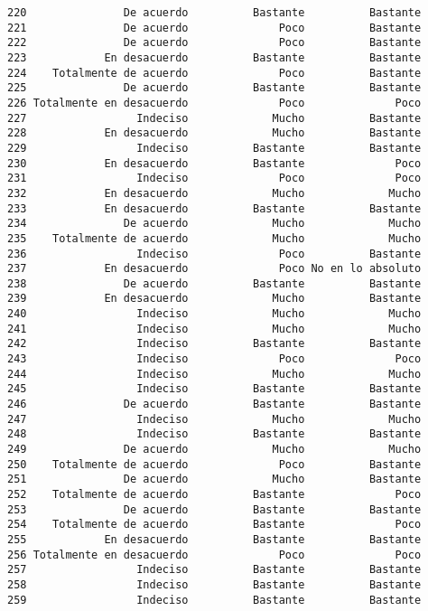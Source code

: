 \documentclass[
  letterpaper,
  DIV=11,
  numbers=noendperiod]{scrartcl}
\begin{document}
\begin{verbatim}
220               De acuerdo          Bastante          Bastante
221               De acuerdo              Poco          Bastante
222               De acuerdo              Poco          Bastante
223            En desacuerdo          Bastante          Bastante
224    Totalmente de acuerdo              Poco          Bastante
225               De acuerdo          Bastante          Bastante
226 Totalmente en desacuerdo              Poco              Poco
227                 Indeciso             Mucho          Bastante
228            En desacuerdo             Mucho          Bastante
229                 Indeciso          Bastante          Bastante
230            En desacuerdo          Bastante              Poco
231                 Indeciso              Poco              Poco
232            En desacuerdo             Mucho             Mucho
233            En desacuerdo          Bastante          Bastante
234               De acuerdo             Mucho             Mucho
235    Totalmente de acuerdo             Mucho             Mucho
236                 Indeciso              Poco          Bastante
237            En desacuerdo              Poco No en lo absoluto
238               De acuerdo          Bastante          Bastante
239            En desacuerdo             Mucho          Bastante
240                 Indeciso             Mucho             Mucho
241                 Indeciso             Mucho             Mucho
242                 Indeciso          Bastante          Bastante
243                 Indeciso              Poco              Poco
244                 Indeciso             Mucho             Mucho
245                 Indeciso          Bastante          Bastante
246               De acuerdo          Bastante          Bastante
247                 Indeciso             Mucho             Mucho
248                 Indeciso          Bastante          Bastante
249               De acuerdo             Mucho             Mucho
250    Totalmente de acuerdo              Poco          Bastante
251               De acuerdo             Mucho          Bastante
252    Totalmente de acuerdo          Bastante              Poco
253               De acuerdo          Bastante          Bastante
254    Totalmente de acuerdo          Bastante              Poco
255            En desacuerdo          Bastante          Bastante
256 Totalmente en desacuerdo              Poco              Poco
257                 Indeciso          Bastante          Bastante
258                 Indeciso          Bastante          Bastante
259                 Indeciso          Bastante          Bastante

\end{verbatim}
\end{document}
